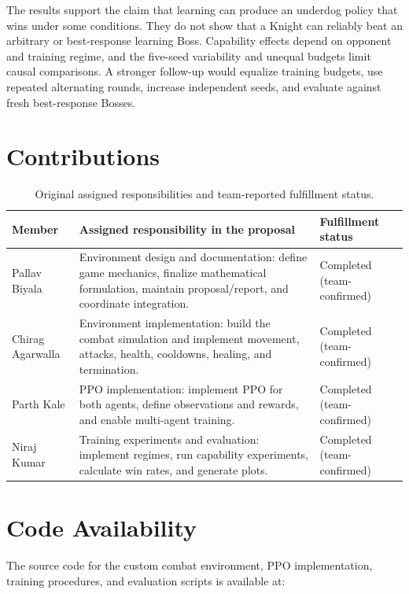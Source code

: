 \documentclass{article}
\begin{document}
The results support the claim that learning can produce an underdog policy that wins under some conditions. They do not show that a Knight can reliably beat an arbitrary or best-response learning Boss. Capability effects depend on opponent and training regime, and the five-seed variability and unequal budgets limit causal comparisons. A stronger follow-up would equalize training budgets, use repeated alternating rounds, increase independent seeds, and evaluate against fresh best-response Bosses.

\section{Contributions}

\begin{table}[H]
\centering
\caption{Original assigned responsibilities and team-reported fulfillment status.}
\label{tab:contributions}
\small
\begin{tabularx}{\textwidth}{@{}p{}X p{}@{}}
\toprule
Member & Assigned responsibility in the proposal & Fulfillment status \\
\midrule
Pallav Biyala & Environment design and documentation: define game mechanics, finalize mathematical formulation, maintain proposal/report, and coordinate integration. & Completed (team-confirmed) \\
Chirag Agarwalla & Environment implementation: build the combat simulation and implement movement, attacks, health, cooldowns, healing, and termination. & Completed (team-confirmed) \\
Parth Kale & PPO implementation: implement PPO for both agents, define observations and rewards, and enable multi-agent training. & Completed (team-confirmed) \\
Niraj Kumar & Training experiments and evaluation: implement regimes, run capability experiments, calculate win rates, and generate plots. & Completed (team-confirmed) \\
\bottomrule
\end{tabularx}
\end{table}

\section*{Code Availability}

The source code for the custom combat environment, PPO implementation, training procedures, and evaluation scripts is available at:
\end{document}
